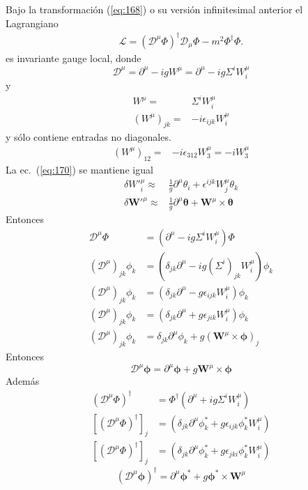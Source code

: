 Bajo la transformaci\'on (\ref{eq:168})  o su versi\'on infinitesimal anterior el Lagrangiano
\begin{align}
  \mathcal{L}=\left(\mathcal{D}^\mu\Phi\right)^\dagger\mathcal{D}_\mu\Phi-m^2\Phi^\dagger \Phi.  
\end{align}
es invariante gauge local, donde
\begin{equation}
\label{eq:256}
    \mathcal{D}^\mu=\partial^\mu-igW^\mu=\partial^\mu-ig\Sigma^iW^\mu_i\nonumber
\end{equation}
y
\begin{align}
  W^\mu=&\Sigma^iW^\mu_i\nonumber\\
(W^\mu)_{jk}=&-i\epsilon_{ijk}W^\mu_i
\end{align}
y s\'olo contiene entradas no diagonales.
\begin{align}
  (W^\mu)_{12}=&-i\epsilon_{312}W^\mu_3=-iW^\mu_3
\end{align}
La ec.~(\ref{eq:170}) se mantiene igual
\begin{align}
    \delta{W'}^\mu_i\approx&\frac{1}{g}\partial^\mu\theta_i+\epsilon^{ijk}W^\mu_j\theta_k\nonumber\\
    \delta{\mathbf{W}'}^\mu\approx&\frac{1}{g}\partial^\mu\boldsymbol{\theta}+\mathbf{W}^\mu\times\boldsymbol{\theta}
\end{align}
Entonces
\begin{align}
  \mathcal{D}^\mu\Phi&=(\partial^\mu-ig\Sigma^iW^\mu_i)\Phi\nonumber\\
  (\mathcal{D}^\mu)_{jk}\phi_k&=(\delta_{jk}\partial^\mu-ig(\Sigma^i)_{jk}W^\mu_i)\phi_k\nonumber\\
  (\mathcal{D}^\mu)_{jk}\phi_k&=(\delta_{jk}\partial^\mu-g\epsilon_{ijk}W^\mu_i)\phi_k\nonumber\\
  (\mathcal{D}^\mu)_{jk}\phi_k&=(\delta_{jk}\partial^\mu+g\epsilon_{jik}W^\mu_i)\phi_k\nonumber\\
  (\mathcal{D}^\mu)_{jk}\phi_k&=\delta_{jk}\partial^\mu\phi_k+g(\mathbf{W}^\mu\times\boldsymbol{\phi})_j\nonumber
\end{align}
Entonces
\begin{equation}
  \label{eq:173}
  \mathcal{D}^\mu\boldsymbol{\phi}=\partial^\mu\boldsymbol{\phi}+g\mathbf{W}^\mu\times\boldsymbol{\phi}  
\end{equation}
Adem\'as
\begin{align}
   (\mathcal{D}^\mu\Phi)^\dagger&=\Phi^\dagger(\partial^\mu+ig\Sigma^iW^\mu_i)\nonumber\\
   [(\mathcal{D}^\mu\Phi)^\dagger]_j&=(\delta_{jk}\partial^\mu\phi^*_k+g\epsilon_{ijk}\phi^*_kW^\mu_i)\nonumber\\
   [(\mathcal{D}^\mu\Phi)^\dagger]_j&=(\delta_{jk}\partial^\mu\phi^*_k+g\epsilon_{jki}\phi^*_kW^\mu_i)
\end{align}
\begin{equation}
\label{eq:176}
  (\mathcal{D}^\mu\boldsymbol{\phi})^\dagger=\partial^\mu\boldsymbol{\phi}^*  +g\boldsymbol{\phi}^*\times\mathbf{W}^\mu
\end{equation}

